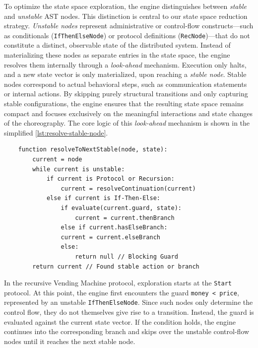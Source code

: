 To optimize the state space exploration, the engine distinguishes between \textit{stable} and \textit{unstable} AST nodes. This distinction is central to our state space reduction strategy. \textit{Unstable nodes} represent administrative or control-flow constructs---such as conditionals (\texttt{IfThenElseNode}) or protocol definitions (\texttt{RecNode})---that do not constitute a distinct, observable state of the distributed system. Instead of materializing these nodes as separate entries in the state space, the engine resolves them internally through a \textit{look-ahead} mechanism.
Execution only halts, and a new state vector is only materialized, upon reaching a \textit{stable node}. Stable nodes correspond to actual behavioral steps, such as communication statements or internal actions. By skipping purely structural transitions and only capturing stable configurations, the engine ensures that the resulting state space remains compact and focuses exclusively on the meaningful interactions and state changes of the choreography.
The core logic of this \emph{look-ahead} mechanism is shown in the simplified \cref{lst:resolve-stable-node}. 

\begin{listing}[h]
\begin{verbatim}
	function resolveToNextStable(node, state):
		current = node
		while current is unstable:
			if current is Protocol or Recursion:
				current = resolveContinuation(current)
			else if current is If-Then-Else:
				if evaluate(current.guard, state):
					current = current.thenBranch
				else if current.hasElseBranch:
				current = current.elseBranch
				else:
					return null // Blocking Guard
		return current // Found stable action or branch
\end{verbatim}
\caption{Resolution of unstable AST nodes during state space exploration, including the handling of blocking guards via the \texttt{null} return value.}
\label{lst:resolve-stable-node}
\end{listing}

In the recursive Vending Machine protocol, exploration starts at the \texttt{Start} protocol. At this point, the engine first encounters the guard \texttt{money < price}, represented by an unstable \texttt{If\-Then\-Else\-Node}. Since such nodes only determine the control flow, they do not themselves give rise to a transition. Instead, the guard is evaluated against the current state vector. If the condition holds, the engine continues into the corresponding branch and skips over the unstable control-flow nodes until it reaches the next stable node.

